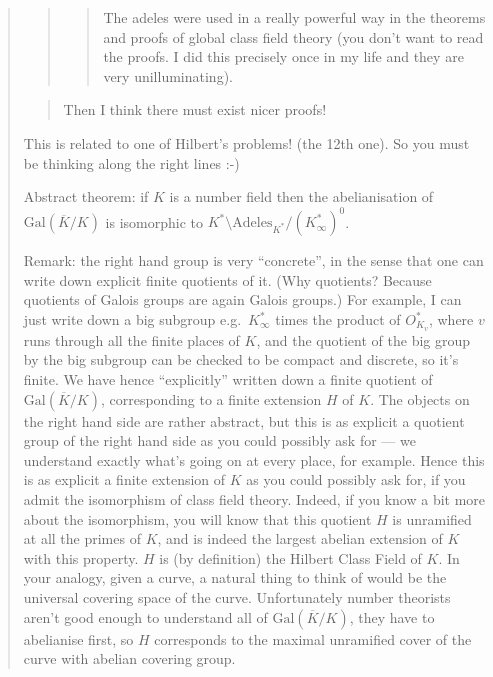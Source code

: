 \documentclass{article}
\begin{document}
\begin{quote}
\begin{quote}
\begin{quote}
The adeles were used in a really powerful way in the theorems and proofs
of global class field theory (you don't want to read the proofs. I did
this precisely once in my life and they are very unilluminating).
\end{quote}
\end{quote}

\begin{quote}
Then I think there must exist nicer proofs!
\end{quote}

This is related to one of Hilbert's problems! (the 12th one). So you
must be thinking along the right lines :-)

Abstract theorem: if \(K\) is a number field then the abelianisation of
\(\mathrm{Gal}(\overline{K}/K)\) is isomorphic to
\(K^*\setminus\mathrm{Adeles}_{K^*}/(K_\infty^*)^0\).

Remark: the right hand group is very ``concrete'', in the sense that one
can write down explicit finite quotients of it. (Why quotients? Because
quotients of Galois groups are again Galois groups.) For example, I can
just write down a big subgroup e.g.~\(K_\infty^*\) times the product of
\(O_{K_v}^*\), where \(v\) runs through all the finite places of \(K\),
and the quotient of the big group by the big subgroup can be checked to
be compact and discrete, so it's finite. We have hence ``explicitly''
written down a finite quotient of \(\mathrm{Gal}(\overline{K}/K)\),
corresponding to a finite extension \(H\) of \(K\). The objects on the
right hand side are rather abstract, but this is as explicit a quotient
group of the right hand side as you could possibly ask for --- we
understand exactly what's going on at every place, for example. Hence
this is as explicit a finite extension of \(K\) as you could possibly
ask for, if you admit the isomorphism of class field theory. Indeed, if
you know a bit more about the isomorphism, you will know that this
quotient \(H\) is unramified at all the primes of \(K\), and is indeed
the largest abelian extension of \(K\) with this property. \(H\) is (by
definition) the Hilbert Class Field of \(K\). In your analogy, given a
curve, a natural thing to think of would be the universal covering space
of the curve. Unfortunately number theorists aren't good enough to
understand all of \(\mathrm{Gal}(\overline{K}/K)\), they have to
abelianise first, so \(H\) corresponds to the maximal unramified cover
of the curve with abelian covering group.


\end{quote}
\end{document}
